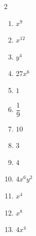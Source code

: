 \documentclass[11pt]{article}
\begin{document}
\begin{keybox}
\begin{multicols}{2}
\small
\begin{enumerate}[leftmargin=*,itemsep=3pt]
  \item $x^9$
  \item $x^{12}$
  \item $y^4$
  \item $27x^6$
  \item $1$
  \item $\dfrac{1}{9}$
  \item $10$
  \item $3$
  \item $4$
  \item $4x^6y^2$
  \item $x^4$
  \item $x^8$
  \item $4x^4$
\end{enumerate}
\end{multicols}
\end{keybox}
\end{document}
